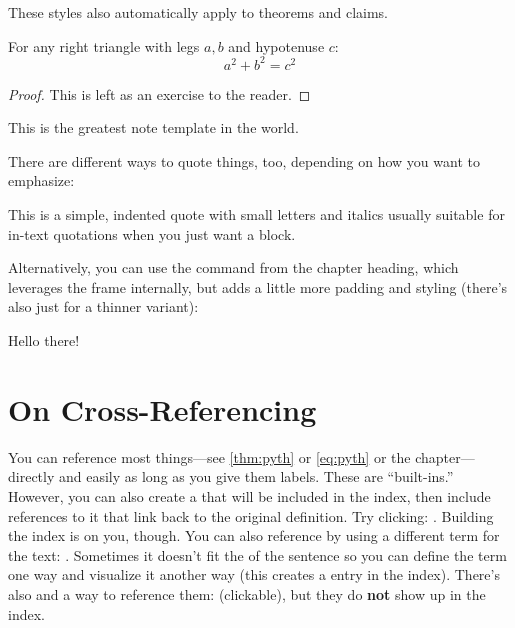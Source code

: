 \documentclass[letterpaper,12pt,notitlepage,twoside]{report}
\begin{document}
\hr{5in}

These styles also automatically apply to theorems and claims.

\begin{theorem}
  \label{thm:pyth}
  For any right triangle with legs $a,b$ and hypotenuse $c$:
  \begin{equation}
    \label{eq:pyth}
    a^2+b^2=c^2
  \end{equation}
\end{theorem}
\begin{proof}
  This is left as an exercise to the reader.
\end{proof}

\begin{claim}
  This is the greatest note template in the world.
\end{claim}

\hr{5in}

There are different ways to quote things, too, depending on how you want to
emphasize:

\begin{quoting}
  This is a simple, indented quote with small letters and italics usually
  suitable for in-text quotations when you just want a block.
\end{quoting}

Alternatively, you can use the  command from
the chapter heading, which leverages the  frame
internally, but adds a little more padding and styling (there's also just
 for a thinner variant):

\begin{thickleftborder}
  Hello there!
\end{thickleftborder}



\section{On Cross-Referencing}
 You can reference most things---see
\autoref{thm:pyth} or \eqref{eq:pyth} or the  chapter---directly
and easily as long as you give them labels. These are ``built-ins.'' However,
you can also create a  that will be included in the index,
then include references to it that link back to the original definition. Try
clicking: . Building the index is on you, though. You can
also reference by using a different term for the text: . Sometimes it doesn't fit the  of the sentence so you can define the term one way and visualize it
another way (this creates a  entry in the index). There's also
 and a way to reference them:  (clickable),
but they do \textbf{not} show up in the index.
\end{document}
